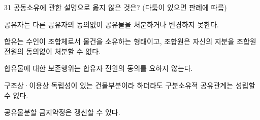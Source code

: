 \begin{question}{31}
공동소유에 관한 설명으로 옳지 않은 것은? (다툼이 있으면 판례에 따름)
\begin{choices}
  \item 공유자는 다른 공유자의 동의없이 공유물을 처분하거나 변경하지 못한다.
  \item 합유는 수인이 조합체로서 물건을 소유하는 형태이고, 조합원은 자신의 지분을 조합원 전원의 동의없이 처분할 수 없다.
  \item 합유물에 대한 보존행위는 합유자 전원의 동의를 요하지 않는다.
  \item 구조상·이용상 독립성이 있는 건물부분이라 하더라도 구분소유적 공유관계는 성립할 수 없다.
  \item 공유물분할 금지약정은 갱신할 수 있다.
\end{choices}
\end{question}

